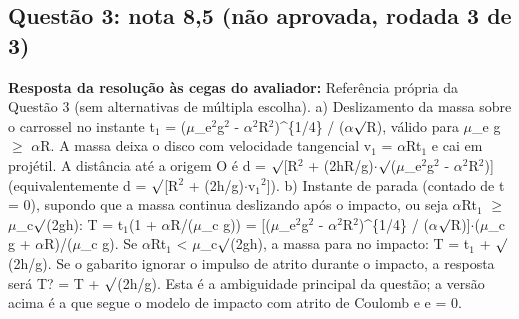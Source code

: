 \documentclass{article}%
\begin{document}
\subsection*{Questão 3: nota 8,5 (não aprovada, rodada 3 de 3)}%
\textbf{Resposta da resolução às cegas do avaliador:} Referência própria da Questão 3 (sem alternativas de múltipla escolha).\newline%
\newline%
a) Deslizamento da massa sobre o carrossel no instante t$_{1}$ = ($\mu$\_e$^2$g$^2$ - $\alpha$$^2$R$^2$)\^{}\{1/4\} / ($\alpha$$\surd$R), válido para $\mu$\_e g $\geq$ $\alpha$R. A massa deixa o disco com velocidade tangencial v$_{1}$ = $\alpha$Rt$_{1}$ e cai em projétil. A distância até a origem O é\newline%
   d = $\surd${[}R$^2$ + (2hR/g)$\cdot$$\surd$($\mu$\_e$^2$g$^2$ - $\alpha$$^2$R$^2$){]}  (equivalentemente d = $\surd${[}R$^2$ + (2h/g)$\cdot$v$_{1}$$^2${]}).\newline%
\newline%
b) Instante de parada (contado de t = 0), supondo que a massa continua deslizando após o impacto, ou seja $\alpha$Rt$_{1}$ $\geq$ $\mu$\_c$\surd$(2gh):\newline%
   T = t$_{1}$(1 + $\alpha$R/($\mu$\_c g)) = {[}($\mu$\_e$^2$g$^2$ - $\alpha$$^2$R$^2$)\^{}\{1/4\} / ($\alpha$$\surd$R){]}$\cdot$($\mu$\_c g + $\alpha$R)/($\mu$\_c g).\newline%
   Se $\alpha$Rt$_{1}$ < $\mu$\_c$\surd$(2gh), a massa para no impacto: T = t$_{1}$ + $\surd$(2h/g).\newline%
   Se o gabarito ignorar o impulso de atrito durante o impacto, a resposta será T? = T + $\surd$(2h/g). Esta é a ambiguidade principal da questão; a versão acima é a que segue o modelo de impacto com atrito de Coulomb e e = 0.\par %
$$
\end{document}
